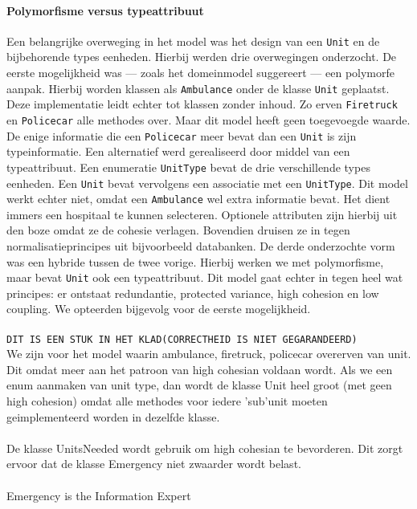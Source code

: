 \documentclass[a4paper, titlepage,12pt]{article}
\begin{document}
\paragraph{Polymorfisme versus typeattribuut}
Een belangrijke overweging in het model was het design van een \verb+Unit+ en de bijbehorende types eenheden. Hierbij werden drie overwegingen onderzocht. De eerste mogelijkheid was --- zoals het domeinmodel suggereert --- een polymorfe aanpak. Hierbij worden klassen als \verb+Ambulance+ onder de klasse \verb+Unit+ geplaatst. Deze implementatie leidt echter tot klassen zonder inhoud. Zo erven \verb+Firetruck+ en \verb+Policecar+ alle methodes over. Maar dit model heeft geen toegevoegde waarde. De enige informatie die een \verb+Policecar+ meer bevat dan een \verb+Unit+ is zijn typeinformatie. Een alternatief werd gerealiseerd door middel van een typeattribuut. Een enumeratie \verb+UnitType+ bevat de drie verschillende types eenheden. Een \verb+Unit+ bevat vervolgens een associatie met een \verb+UnitType+. Dit model werkt echter niet, omdat een \verb+Ambulance+ wel extra informatie bevat. Het dient immers een hospitaal te kunnen selecteren. Optionele attributen zijn hierbij uit den boze omdat ze de cohesie verlagen. Bovendien druisen ze in tegen normalisatieprincipes uit bijvoorbeeld databanken. De derde onderzochte vorm was een hybride tussen de twee vorige. Hierbij werken we met polymorfisme, maar bevat \verb+Unit+ ook een typeattribuut. Dit model gaat echter in tegen heel wat principes: er ontstaat redundantie, protected variance, high cohesion en low coupling. We opteerden bijgevolg voor de eerste mogelijkheid.
\paragraph{}

\newpage{}
\paragraph{}
\verb+DIT IS EEN STUK IN HET KLAD(CORRECTHEID IS NIET GEGARANDEERD)+\\
We zijn voor het model waarin ambulance, firetruck, policecar overerven van unit. Dit omdat meer aan het patroon van high cohesian voldaan wordt. Als we een enum aanmaken van unit type, dan wordt de klasse Unit heel groot (met geen high cohesion) omdat alle methodes voor iedere 'sub'unit moeten geimplementeerd worden in dezelfde klasse.\\\\
De klasse UnitsNeeded wordt gebruik om high cohesian te bevorderen. Dit zorgt ervoor dat de klasse Emergency niet zwaarder wordt belast.\\\\
Emergency is the Information Expert
\newpage
\end{document}
